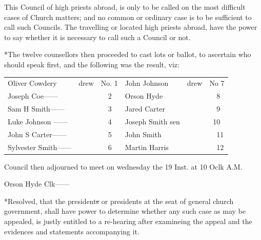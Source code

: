 					This Council of high priests abroad, is only to be called on the most difficult cases of Church matters; and no common or ordinary case is to be sufficient to call such Councils. The travelling or located high priests abroad, have the power to say whether it is necessary to call such a Council or not.

					*The twelve counsellors then proceeded to cast lots or ballot, to ascertain who should speak first, and the following was the result, viz:

					\begin{tabular}{p{1.5in}p{1cm}p{1cm}p{1.5in}p{1cm}p{1cm}}				
					Oliver Cowdery & drew & No. 1 & John Johnson & drew & No 7 \\
					Joseph Coe------ &  & \textquotesingle\textquotesingle\ \textquotesingle\textquotesingle\ 2 & Orson Hyde &  & \textquotesingle\textquotesingle\ \textquotesingle\textquotesingle\ 8 \\
					Sam\supers{l.} H Smith------ &  & \textquotesingle\textquotesingle\ \textquotesingle\textquotesingle\ 3 & Jared Carter &  & \textquotesingle\textquotesingle\ \textquotesingle\textquotesingle\ 9 \\
					Luke Johnson ------ &  & \textquotesingle\textquotesingle\ \textquotesingle\textquotesingle\ 4 & Joseph Smith sen &  & \textquotesingle\textquotesingle\ 10 \\
					John S Carter------ &  & \textquotesingle\textquotesingle\ \textquotesingle\textquotesingle\ 5 & John Smith &  & \textquotesingle\textquotesingle\ \textquotesingle\textquotesingle\ 11 \\
					Sylvester Smith------ &  & \textquotesingle\textquotesingle\ \textquotesingle\textquotesingle\ 6 & Martin Harris &  & \textquotesingle\textquotesingle\ \textquotesingle\textquotesingle\ 12\\
					\end{tabular}

					Council then adjourned to meet on wednesday the 19 Inst. at 10 Oclk A.M.

					\begin{tightright}
					Orson Hyde Clk------
					\end{tightright}

					*Resolved, that the president\sout{s} or presidents at the seat of general church government, shall have power to determine whether any such case as may be appealed, is justly entitled to a re-hearing after examineing the appeal and the evidences and statements accompanying it.
					
